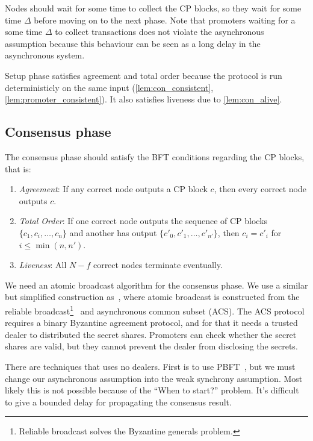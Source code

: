 Nodes should wait for some time to collect the CP blocks, so they wait for some
time $\Delta$ before moving on to the next phase. Note that promoters waiting
for a some time $\Delta$ to collect transactions does not violate the
asynchronous assumption because this behaviour can be seen as a long delay in
the asynchronous system.

\begin{corollary}
  Setup phase satisfies agreement and total order because the protocol is run
  deterministicly on the same input (\cref{lem:con_consistent},
  \cref{lem:promoter_consistent}). It also satisfies liveness due to
  \cref{lem:con_alive}.
\end{corollary}

\subsection{Consensus phase}
The consensus phase should satisfy the BFT conditions regarding the CP blocks,
that is:
\begin{enumerate}
\item \emph{Agreement}: If any correct node outputs a CP block $c$, then every
  correct node outputs $c$.
\item \emph{Total Order}: If one correct node outputs the sequence of CP blocks
  $\{c_1, c_i, \dots, c_n\}$ and another has output $\{c'_0, c'_1, \dots,
  c'_{n'} \}$, then $c_i = c'_i$ for $i \le \min(n, n')$.
\item \emph{Liveness}: All $N - f$ correct nodes terminate eventually.
\end{enumerate}

We need an atomic broadcast algorithm for the consensus phase. We use a similar
but simplified construction as~\cite{miller2016honey}, where atomic broadcast is
constructed from the reliable broadcast\footnote{Reliable broadcast solves the
  Byzantine generals problem.}~\cite{bracha1984asynchronous} and asynchronous
common subset (ACS). The ACS protocol requires a binary Byzantine agreement
protocol, and for that it needs a trusted dealer to distributed the secret
shares. Promoters can check whether the secret shares are valid, but they cannot
prevent the dealer from disclosing the secrets.

There are techniques that uses no dealers. First is to use
PBFT~\cite{castro1999practical}, but we must change our asynchronous assumption
into the weak synchrony assumption. Most likely this is not possible because of
the ``When to start?'' problem. It's difficult to give a bounded delay for
propagating the consensus result.


